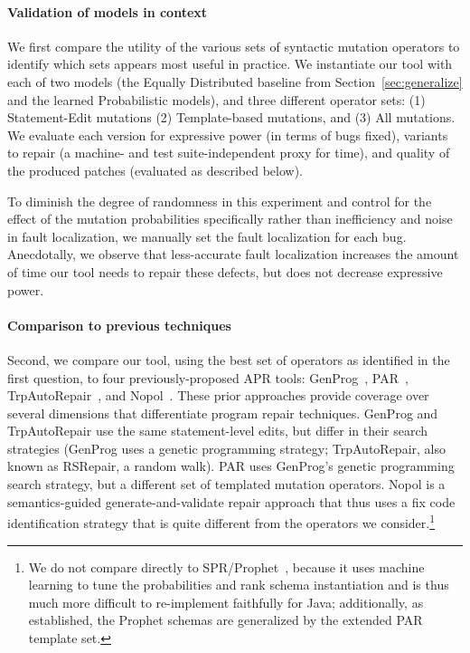 \documentclass[conference]{IEEEtran}
\begin{document}
\paragraph{Validation of models in context} We first compare the utility of the
various sets of syntactic mutation operators to 
identify which sets appears most useful in practice. We
instantiate our tool with each of 
two models (the Equally Distributed baseline from Section~\ref{sec:generalize}
and the learned Probabilistic models), and three different operator sets: (1) Statement-Edit mutations (2)
Template-based mutations, and (3) All mutations. We evaluate each version
for expressive power (in terms of bugs fixed), variants to repair (a machine-
and test suite-independent proxy for time), and quality of the produced patches
(evaluated as described below). 

To diminish the degree of randomness in this experiment and control for the
effect of the mutation probabilities specifically rather than inefficiency and
noise in fault localization, we manually set the fault localization for each
bug. Anecdotally, we observe that less-accurate fault localization increases the
amount of time our tool needs to repair these defects, but does not decrease expressive
power.  

\paragraph{Comparison to previous techniques} Second, we compare our tool, using
the best set of operators as identified in the first question, to four
previously-proposed APR tools: GenProg~\cite{legoues12Genprog}, PAR~\cite{kim2013}, TrpAutoRepair~\cite{Qi13TrpAutoR},
and Nopol~\cite{xuanNopol}. These prior approaches provide coverage over
several dimensions that differentiate program repair techniques.  GenProg and
TrpAutoRepair use the same statement-level edits, but differ in their search
strategies (GenProg uses a genetic programming strategy; TrpAutoRepair, also
known as RSRepair, a random walk). PAR uses GenProg's genetic programming search
strategy, but a different set of templated mutation operators.  Nopol is a
semantics-guided generate-and-validate repair approach that thus uses a fix code
identification strategy that is quite different from the operators we
consider.\footnote{We do not compare directly to
  SPR/Prophet~\cite{long16proph}, because it uses machine learning to tune the
  probabilities and rank schema instantiation and is thus much more
  difficult to re-implement faithfully for Java; additionally, as established,
  the Prophet  schemas are generalized by the extended PAR template set.}
\end{document}
